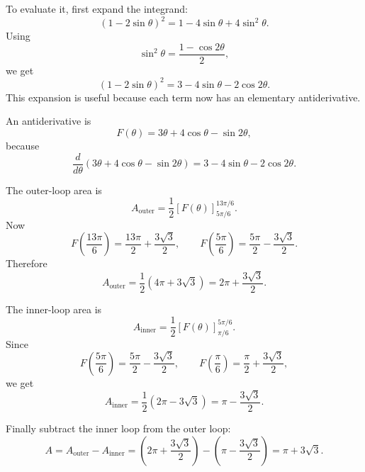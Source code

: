 \documentclass[a4paper,12pt,twocolumn]{article}
\newenvironment{solutionbox}{\begin{framed}}{\end{framed}}
\begin{document}
\begin{solutionbox}
\begin{steps}
\item To evaluate it, first expand the integrand:
\[
(1-2\sin\theta)^2
=1-4\sin\theta+4\sin^2\theta.
\]
Using
\[
\sin^2\theta=\frac{1-\cos 2\theta}{2},
\]
we get
\[
(1-2\sin\theta)^2
=3-4\sin\theta-2\cos 2\theta.
\]
This expansion is useful because each term now has an elementary antiderivative.

\item An antiderivative is
\[
F(\theta)=3\theta+4\cos\theta-\sin 2\theta,
\]
because
\[
\frac{d}{d\theta}\left(3\theta+4\cos\theta-\sin 2\theta\right)
=3-4\sin\theta-2\cos 2\theta.
\]

\item The outer-loop area is
\[
A_{\text{outer}}
=\frac12\left[F(\theta)\right]_{5\pi/6}^{13\pi/6}.
\]
Now
\[
F\!\left(\frac{13\pi}{6}\right)
=\frac{13\pi}{2}+\frac{3\sqrt3}{2},
\qquad
F\!\left(\frac{5\pi}{6}\right)
=\frac{5\pi}{2}-\frac{3\sqrt3}{2}.
\]
Therefore
\[
A_{\text{outer}}
=\frac12\left(4\pi+3\sqrt3\right)
=2\pi+\frac{3\sqrt3}{2}.
\]

\item The inner-loop area is
\[
A_{\text{inner}}
=\frac12\left[F(\theta)\right]_{\pi/6}^{5\pi/6}.
\]
Since
\[
F\!\left(\frac{5\pi}{6}\right)
=\frac{5\pi}{2}-\frac{3\sqrt3}{2},
\qquad
F\!\left(\frac{\pi}{6}\right)
=\frac{\pi}{2}+\frac{3\sqrt3}{2},
\]
we get
\[
A_{\text{inner}}
=\frac12\left(2\pi-3\sqrt3\right)
=\pi-\frac{3\sqrt3}{2}.
\]

\item Finally subtract the inner loop from the outer loop:
\[
A=A_{\text{outer}}-A_{\text{inner}}
=\left(2\pi+\frac{3\sqrt3}{2}\right)
-\left(\pi-\frac{3\sqrt3}{2}\right)
=\pi+3\sqrt3.
\]
\end{steps}
\end{solutionbox}
\end{document}
